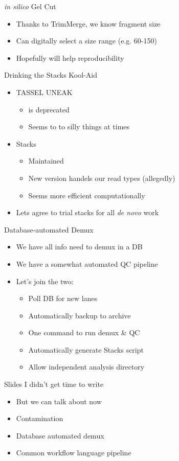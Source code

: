 \documentclass[t]{beamer}
\begin{document}
\begin{frame}{\textit{in silico} Gel Cut}
  \begin{itemize}
    \item Thanks to TrimMerge, we know fragment size
    \item Can digitally select a size range (e.g. 60-150)
    \item Hopefully will help reproducibility
  \end{itemize}
\end{frame}


\begin{frame}{Drinking the Stacks Kool-Aid}
  \begin{itemize}
    \item TASSEL UNEAK
      \begin{itemize}
        \item is deprecated
        \item Seems to to silly things at times
      \end{itemize}
    \item Stacks
      \begin{itemize}
        \item Maintained
        \item New version handels our read types (allegedly)
        \item Seems more efficient computationally
      \end{itemize}
    \item Lets agree to trial stacks for all \textit{de novo} work
  \end{itemize}
\end{frame}

\begin{frame}{Database-automated Demux}
  \begin{itemize}
    \item We have all info need to demux in a DB
    \item We have a somewhat automated QC pipeline
    \item Let's join the two:
      \begin{itemize}
        \item Poll DB for new lanes
        \item Automatically backup to archive
        \item One command to run demux \& QC
        \item Automatically generate Stacks script
        \item Allow independent analysis directory
      \end{itemize}
  \end{itemize}
\end{frame}

\begin{frame}{Slides I didn't get time to write}
  \begin{itemize}
    \item[] {\large But we can talk about now}
    \item Contamination
    \item Database automated demux
    \item Common workflow language pipeline
  \end{itemize}
\end{frame}
\end{document}
